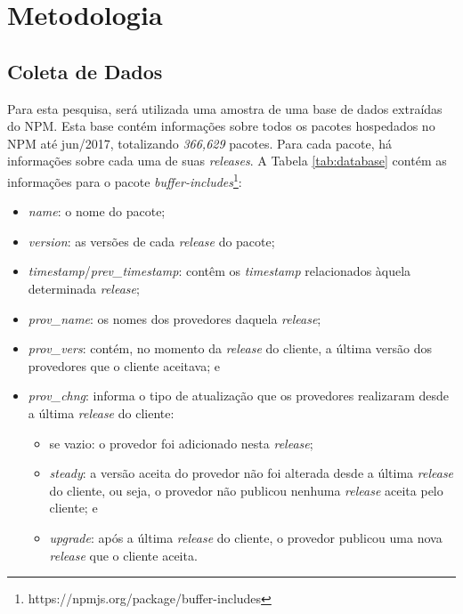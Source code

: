 \chapter{Metodologia}
\label{cap:metodologia}

\section{Coleta de Dados}
\label{sec:col_dados}
Para esta pesquisa, será utilizada uma amostra de uma base de dados extraídas do \gls{NPM}. Esta base contém informações sobre todos os pacotes hospedados no \gls{NPM} até jun/2017, totalizando \textit{366,629} pacotes. Para cada pacote, há informações sobre cada uma de suas \textit{releases}. A Tabela \ref{tab:database} contém as informações para o pacote \textit{buffer-includes}\footnote{https://npmjs.org/package/buffer-includes}:

\begin{itemize}
    \item \textit{name}: o nome do pacote;
    \item \textit{version}: as versões de cada \textit{release} do pacote;
    \item \textit{timestamp}/\textit{prev\_timestamp}: contêm os \textit{timestamp} relacionados àquela determinada \textit{release};
    \item \textit{prov\_name}: os nomes dos provedores daquela \textit{release};
    \item \textit{prov\_vers}: contém, no momento da \textit{release} do cliente, a última versão dos provedores que o cliente aceitava; e
    \item \textit{prov\_chng}: informa o tipo de atualização que os provedores realizaram desde a última \textit{release} do cliente:
    \begin{itemize}
        \item se vazio: o provedor foi adicionado nesta \textit{release};
        \item \textit{steady}: a versão aceita do provedor não foi alterada desde a última \textit{release} do cliente, ou seja, o provedor não publicou nenhuma \textit{release} aceita pelo cliente; e
        \item \textit{upgrade}: após a última \textit{release} do cliente, o provedor publicou uma nova \textit{release} que o cliente aceita.
    \end{itemize}
\end{itemize}{}
  
